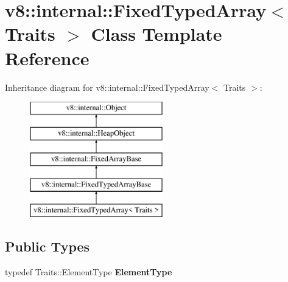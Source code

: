 \hypertarget{classv8_1_1internal_1_1_fixed_typed_array}{}\section{v8\+:\+:internal\+:\+:Fixed\+Typed\+Array$<$ Traits $>$ Class Template Reference}
\label{classv8_1_1internal_1_1_fixed_typed_array}
Inheritance diagram for v8\+:\+:internal\+:\+:Fixed\+Typed\+Array$<$ Traits $>$\+:\begin{figure}[H]
\begin{center}
\leavevmode
\includegraphics[height=5.000000cm]{classv8_1_1internal_1_1_fixed_typed_array}
\end{center}
\end{figure}
\subsection*{Public Types}
\begin{DoxyCompactItemize}
\item 
typedef Traits\+::\+Element\+Type {\bfseries Element\+Type}\hypertarget{classv8_1_1internal_1_1_fixed_typed_array_afa6365d991229911088bf53ea95efb70}{}\label{classv8_1_1internal_1_1_fixed_typed_array_afa6365d991229911088bf53ea95efb70}

\end{DoxyCompactItemize}
